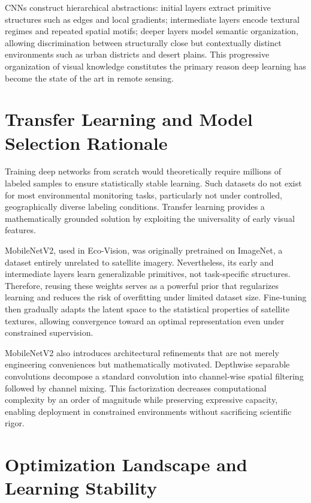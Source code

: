 \documentclass[12pt,a4paper]{report}
\begin{document}
CNNs construct hierarchical abstractions: initial layers extract primitive structures such as edges and local gradients; intermediate layers encode textural regimes and repeated spatial motifs; deeper layers model semantic organization, allowing discrimination between structurally close but contextually distinct environments such as urban districts and desert plains. This progressive organization of visual knowledge constitutes the primary reason deep learning has become the state of the art in remote sensing.

\section{Transfer Learning and Model Selection Rationale}

Training deep networks from scratch would theoretically require millions of labeled samples to ensure statistically stable learning. Such datasets do not exist for most environmental monitoring tasks, particularly not under controlled, geographically diverse labeling conditions. Transfer learning provides a mathematically grounded solution by exploiting the universality of early visual features.

MobileNetV2, used in Eco-Vision, was originally pretrained on ImageNet, a dataset entirely unrelated to satellite imagery. Nevertheless, its early and intermediate layers learn generalizable primitives, not task-specific structures. Therefore, reusing these weights serves as a powerful prior that regularizes learning and reduces the risk of overfitting under limited dataset size. Fine-tuning then gradually adapts the latent space to the statistical properties of satellite textures, allowing convergence toward an optimal representation even under constrained supervision.

MobileNetV2 also introduces architectural refinements that are not merely engineering conveniences but mathematically motivated. Depthwise separable convolutions decompose a standard convolution into channel-wise spatial filtering followed by channel mixing. This factorization decreases computational complexity by an order of magnitude while preserving expressive capacity, enabling deployment in constrained environments without sacrificing scientific rigor.

\section{Optimization Landscape and Learning Stability}
\end{document}
